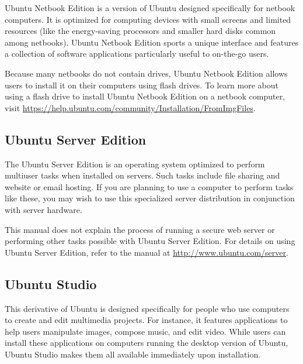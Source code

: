 Ubuntu Netbook Edition is a version of Ubuntu designed specifically for netbook computers. It is optimized for computing devices with small screens and limited resources (like the energy-saving processors and smaller hard disks common among netbooks). Ubuntu Netbook Edition sports a unique interface and features a collection of software applications particularly useful to on-the-go users.

Because many netbooks do not contain  drives, Ubuntu Netbook Edition allows users to install it on their computers using  flash drives. To learn more about using a flash drive to install Ubuntu Netbook Edition on a netbook computer, visit \url{https://help.ubuntu.com/community/Installation/FromImgFiles}.

\subsection{Ubuntu Server Edition}
\label{sec:server-edition}

The Ubuntu Server Edition is an operating system optimized to perform multiuser tasks when installed on servers. Such tasks include file sharing and website or email hosting. If you are planning to use a computer to perform tasks like these, you may wish to use this specialized server distribution in conjunction with server hardware.

This manual does not explain the process of running a secure web server or performing other tasks possible with Ubuntu Server Edition. For details on using Ubuntu Server Edition, refer to the manual at \url{http://www.ubuntu.com/server}.

\subsection{Ubuntu Studio}
\label{sec:studio}

This derivative of Ubuntu is designed specifically for people who use computers to create and edit multimedia projects. For instance, it features applications to help users manipulate images, compose music, and edit video. While users can install these applications on computers running the desktop version of Ubuntu, Ubuntu Studio makes them all available immediately upon installation.

